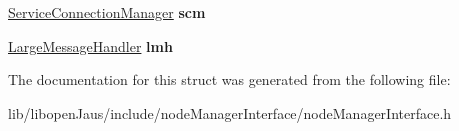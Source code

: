 \begin{DoxyCompactItemize}
\item 
\hypertarget{struct_node_manager_interface_struct_adfc1b0aac184f26b815a6df5d8f15836}{\hyperlink{struct_service_connection_manager_struct}{\-Service\-Connection\-Manager} {\bfseries scm}}\label{struct_node_manager_interface_struct_adfc1b0aac184f26b815a6df5d8f15836}

\item 
\hypertarget{struct_node_manager_interface_struct_afb5d2e2d8c9bfbc7c0caa5731c7a1b7c}{\hyperlink{struct_large_message_handler_struct}{\-Large\-Message\-Handler} {\bfseries lmh}}\label{struct_node_manager_interface_struct_afb5d2e2d8c9bfbc7c0caa5731c7a1b7c}

\end{DoxyCompactItemize}


\-The documentation for this struct was generated from the following file\-:\begin{DoxyCompactItemize}
\item 
lib/libopen\-Jaus/include/node\-Manager\-Interface/node\-Manager\-Interface.\-h\end{DoxyCompactItemize}
